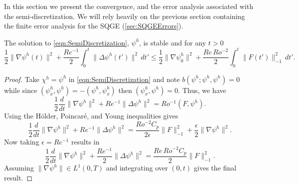 In this section we present the convergence, and the error analysis associated
with the semi-discretization. We will rely heavily on the previous section
containing the finite error analysis for the SQGE (\autoref{sec:SQGEErrors}).

\begin{prop} \label{prop:Stability}
  The solution to \eqref{eqn:SemiDiscretization}, $\psi^h$, is stable and for any $t>0$
  \begin{equation}
    \frac{1}{2}\|\nabla \psi^h(t)\|^2 + \frac{Re^{-1}}{2}\int_{0}^{t}\! \|\Delta
      \psi^h(t')\|^2 \, dt' \le \frac{1}{2} \|\nabla \psi^h_0\|^2
      + \frac{Re\, Ro^{-2}}{2} \int_{0}^{t}\! \|F(t')\|^2_{-1}\, dt'.
    \label{eqn:Stability}
  \end{equation}
\end{prop}
\begin{proof}
  Take $\chi^h = \psi^h$ in \eqref{eqn:SemiDiscretization} and note $b(\psi^h;\psi^h,\psi^h)
  = 0$ while since $(\psi^h_x,\psi^h) = -(\psi^h,\psi^h_x)$ then $(\psi^h_x,
  \psi^h) = 0$. Thus, we have
  \begin{equation*}
    \frac{1}{2} \frac{d}{dt} \|\nabla \psi^h\|^2 + Re^{-1} \|\Delta \psi^h\|^2 =
      Ro^{-1} (F,\psi^h).
  \end{equation*}
  Using the H\"older, Poincar\'e, and Young inequalities gives
  \begin{equation*}
    \frac{1}{2} \frac{d}{dt} \|\nabla \psi^h\|^2 + Re^{-1} \|\Delta \psi^h\|^2 =
      \frac{Ro^{-2} C_p}{2\epsilon} \|F\|_{-1}^2 + \frac{\epsilon}{2}\|\nabla
      \psi^h\|^2.
  \end{equation*}
  Now taking $\epsilon = Re^{-1}$ results in
  \begin{equation*}
    \frac{1}{2} \frac{d}{dt} \|\nabla \psi^h\|^2 + \frac{Re^{-1}}{2} \|\Delta
      \psi^h\|^2 = \frac{Re\,Ro^{-2} C_p}{2} \|F\|_{-1}^2.
  \end{equation*}
  Assuming $\|\nabla \psi^h\| \in L^1(0,T)$ and integrating over $(0,t)$ gives
  the final result.
\end{proof}

